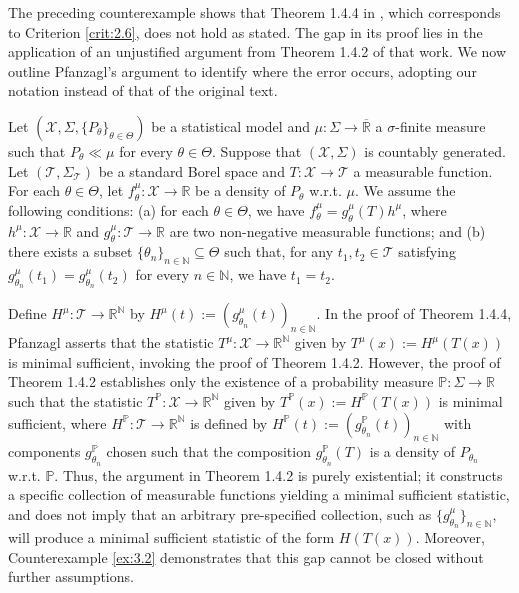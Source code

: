 \documentclass[12pt]{article}
\begin{document}
The preceding counterexample shows that Theorem 1.4.4 in \cite{Pfanzagl1994}, which corresponds to Criterion \ref{crit:2.6}, does not hold as stated. The gap in its proof lies in the application of an unjustified argument from Theorem 1.4.2 of that work. We now outline Pfanzagl's argument to identify where the error occurs, adopting our notation instead of that of the original text.

Let $(\mathcal{X},\Sigma,\{P_\theta\}_{\theta\in\Theta })$ be a statistical model and $\mu :\Sigma\to\overline{\mathbb{R}}$ a $\sigma$-finite measure such that $P_\theta \ll \mu $ for every $\theta\in\Theta$. Suppose that $(\mathcal{X},\Sigma )$ is countably generated. Let $(\mathcal{T},\Sigma _\mathcal{T})$ be a standard Borel space and $T:\mathcal{X}\to \mathcal{T}$ a measurable function. For each $\theta\in\Theta$, let $f_\theta^\mu :\mathcal{X}\to \mathbb{R}$ be a density of $P_\theta$ w.r.t. $\mu$. We assume the following conditions: (a) for each $\theta\in\Theta$, we have $f_\theta^\mu =g_\theta^\mu (T)h^\mu$, where $h^\mu:\mathcal{X}\to \mathbb{R}$ and $g_\theta^\mu :\mathcal{T}\to \mathbb{R}$ are two non-negative measurable functions; and (b) there exists a subset $\{\theta_n\}_{n\in\mathbb{N}}\subseteq\Theta$ such that, for any $t_1,t_2\in \mathcal{T}$ satisfying $g_{\theta_n}^\mu (t_1)=g_{\theta_n}^\mu (t_2)$ for every $n\in\mathbb{N}$, we have $t_1=t_2$.

Define $H^\mu :\mathcal{T}\to \mathbb{R}^\mathbb{N}$ by $H^\mu (t):=(g_{\theta _n}^\mu(t))_{n\in\mathbb{N}}$. In the proof of Theorem 1.4.4, Pfanzagl asserts that the statistic $T^{\mu }:\mathcal{X}\to \mathbb{R}^\mathbb{N}$ given by $T^\mu (x):=H^\mu (T(x))$ is minimal sufficient, invoking the proof of Theorem 1.4.2. However, the proof of Theorem 1.4.2 establishes only the existence of a probability measure $\mathbb{P}:\Sigma \to \mathbb{R}$ such that the statistic $T^\mathbb{P}:\mathcal{X}\to \mathbb{R}^\mathbb{N}$ given by $T^\mathbb{P}(x):=H^\mathbb{P}(T(x))$ is minimal sufficient, where $H^\mathbb{P}:\mathcal{T}\to \mathbb{R}^\mathbb{N}$ is defined by $H^\mathbb{P}(t):=(g_{\theta _n}^\mathbb{P}(t))_{n\in\mathbb{N}}$ with components $g_{\theta _n}^\mathbb{P}$ chosen such that the composition $g_{\theta _n}^\mathbb{P}(T)$ is a density of $P_{\theta _n}$ w.r.t. $\mathbb{P}$. Thus, the argument in Theorem 1.4.2 is purely existential; it constructs a specific collection of measurable functions yielding a minimal sufficient statistic, and does not imply that an arbitrary pre-specified collection, such as $\{ g_{\theta _n}^\mu \}_{n\in\mathbb{N}}$, will produce a minimal sufficient statistic of the form $H(T(x))$. Moreover, Counterexample \ref{ex:3.2} demonstrates that this gap cannot be closed without further assumptions.
\end{document}
